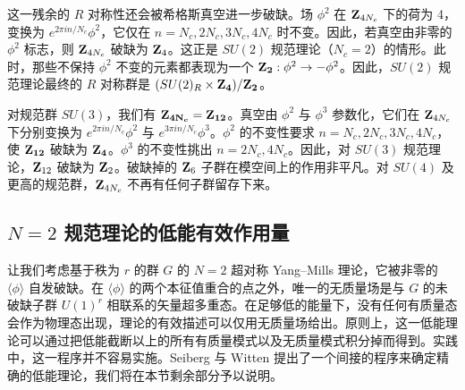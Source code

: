 这一残余的 $R$ 对称性还会被希格斯真空进一步破缺。场 $\phi^2$ 在 ${\bf Z}_{4N_c}$ 下的荷为 4，变换为 $e^{2\pi i n/N_c}\phi^2$，它仅在 $n=N_c,2N_c,3N_c,4N_c$ 时不变。因此，若真空由非零的 $\phi^2$ 标志，则 ${\bf Z}_{4N_c}$ 破缺为 ${\bf Z}_4$。这正是 $SU(2)$ 规范理论（$N_c=2$）的情形。此时，那些不保持 $\phi^2$ 不变的元素都表现为一个 ${\bf Z_2}: \phi^2\rightarrow -\phi^2$。因此，$SU(2)$ 规范理论最终的 $R$ 对称群是 $(SU(2)_R\times {\bf Z_4})/{\bf Z_2}$。

对规范群 $SU(3)$，我们有 ${\bf Z_{4N_c}}={\bf Z_{12}}$。真空由 $\phi^2$ 与 $\phi^3$ 参数化，它们在 ${\bf Z}_{4N_c}$ 下分别变换为 $e^{2\pi i n/N_c}\phi^2$ 与 $e^{3\pi i n/N_c}\phi^3$。$\phi^2$ 的不变性要求 $n=N_c,2N_c,3N_c,4N_c$，使 ${\bf Z_{12}}$ 破缺为 ${\bf Z_{4}}$。$\phi^3$ 的不变性挑出 $n=2N_c, 4N_c$。因此，对 $SU(3)$ 规范理论，${\bf Z}_{12}$ 破缺为 ${\bf Z}_2$。破缺掉的 ${\bf Z}_6$ 子群在模空间上的作用非平凡。对 $SU(4)$ 及更高的规范群，${\bf Z}_{4N_c}$ 不再有任何子群留存下来。



\subsection{$N=2$ 规范理论的低能有效作用量}

让我们考虑基于秩为 $r$ 的群 $G$ 的 $N=2$ 超对称 Yang--Mills 理论，它被非零的 $\langle\phi\rangle$ 自发破缺。在 $\langle\phi\rangle$ 的两个本征值重合的点之外，唯一的无质量场是与 $G$ 的未破缺子群 $U(1)^{r}$ 相联系的矢量超多重态。在足够低的能量下，没有任何有质量态会作为物理态出现，理论的有效描述可以仅用无质量场给出。原则上，这一低能理论可以通过把低能截断以上的所有有质量模式以及无质量模式积分掉而得到。实践中，这一程序并不容易实施。Seiberg 与 Witten 提出了一个间接的程序来确定精确的低能理论，我们将在本节剩余部分予以说明。

